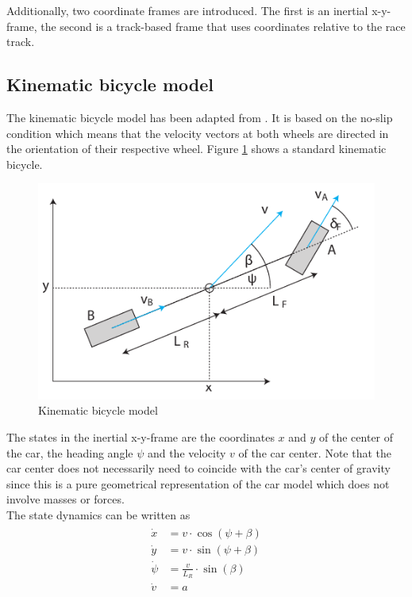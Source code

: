Additionally, two coordinate frames are introduced. The first is an inertial x-y-frame, the second is a track-based frame that uses coordinates relative to the race track.

\subsection{Kinematic bicycle model}
The kinematic bicycle model has been adapted from \cite{rajamani2005vehicle}. It is based on the no-slip condition which means that the velocity vectors at both wheels are directed in the orientation of their respective wheel.
Figure \ref{fig:kinModel} shows a standard kinematic bicycle.
\begin{figure}[ht]
	\centering
  	\includegraphics{../../Figures/Models/KinModel.pdf}
	\caption{Kinematic bicycle model}
	\label{fig:kinModel}
\end{figure}
The states in the inertial x-y-frame are the coordinates $x$ and $y$ of the center of the car, the heading angle $\psi$ and the velocity $v$ of the car center. Note that the car center does not necessarily need to coincide with the car's center of gravity since this is a pure geometrical representation of the car model which does not involve masses or forces.\\
The state dynamics can be written as
\begin{align}
\begin{split}
    \dot x &= v \cdot \cos (\psi + \beta)\\
    \dot y &= v \cdot \sin (\psi + \beta)\\
    \dot \psi &= \frac{v}{L_R}\cdot\sin(\beta)\\
    \dot v &= a
\end{split}
\end{align}
